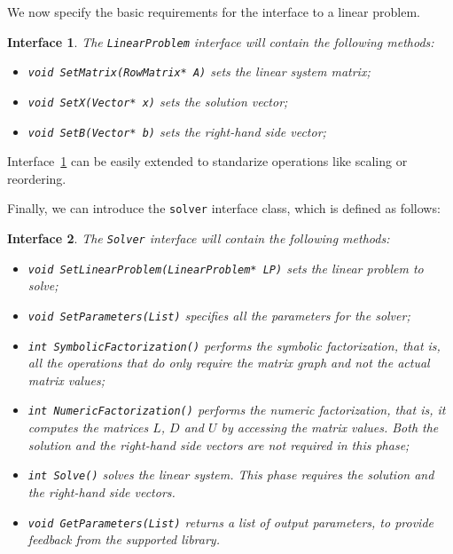 \documentclass[acmtocl]{acmtrans2m}
\newtheorem{interface}{Interface}[section]
\begin{document}
\smallskip

We now specify the basic requirements for the interface to a linear problem.
\begin{interface}
\label{int:lp}
The {\tt LinearProblem} interface
will contain the following methods:
\begin{itemize}
\item \verb!void SetMatrix(RowMatrix* A)! sets the linear system matrix;
\item \verb!void SetX(Vector* x)! sets the solution vector;
\item \verb!void SetB(Vector* b)! sets the right-hand side vector;
\end{itemize}
\end{interface}
Interface~\ref{int:lp} can be easily extended to 
standarize operations like scaling or reordering.



\smallskip

Finally, we can introduce the {\tt solver} interface class, which is defined as
follows:
\begin{interface}
\label{int:asi}
The {\tt Solver} interface
will contain the following methods:
\begin{itemize}
\item \verb!void SetLinearProblem(LinearProblem* LP)! sets the linear problem
to solve;
\item \verb!void SetParameters(List)! specifies all the parameters for the solver;
\item \verb!int SymbolicFactorization()! performs the symbolic factorization, that
is, all the operations that do only require the matrix graph and not the
actual matrix values;
\item \verb!int NumericFactorization()! performs the numeric factorization, that
is, it computes the matrices $L$, $D$ and $U$ by accessing the matrix values.
Both the solution and the right-hand side vectors are not required in this phase;
\item \verb!int Solve()! solves the linear system. This phase requires the
solution and the right-hand side vectors.
\item \verb!void GetParameters(List)! returns a list of output parameters, to
provide feedback from the supported library.
\end{itemize}
\end{interface}
\end{document}
